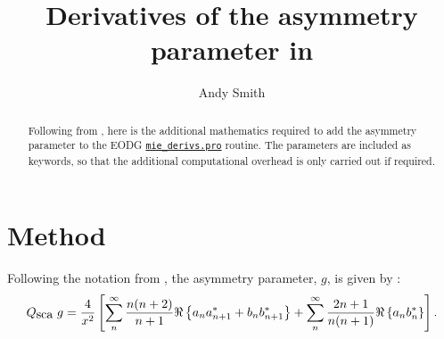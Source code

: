 \documentclass[a4paper,10pt]{article}
\title{Derivatives of the asymmetry parameter in \mied}
\author{Andy Smith}
\def \Qsca { {Q_{\mbox{\rm sca}}}}
\def \asym { {g} }
\def \mied { \href{/home/crun/eodg/idl/mie/mie_derivs.pro}{\tt mie\_derivs.pro} }
\begin{document}
\maketitle

\begin{abstract}
Following from \citet{Grainger2004}, here is the additional mathematics required to add the asymmetry parameter to the EODG \mied routine.
The parameters are included as keywords, so that the additional computational overhead is only carried out if required.
\end{abstract}


\section{Method}


Following the notation from \citet{Grainger2004}, the asymmetry parameter, $\asym$, is given by \citep{Bohren1983}:
\begin{equation}
 \Qsca \; \asym = \frac{4}{x^2} \left[   \sum_n^\infty \frac{n(n+2)}{n+1} \Re \left\{ a_na^*_{n+1} +  b_n b^*_{n+1}  \right\}
                                    +  \sum_n^\infty \frac{2n+1}{n(n+1)} \Re \left\{ a_n b^*_n \right\}\right].
\end{equation}
\end{document}
